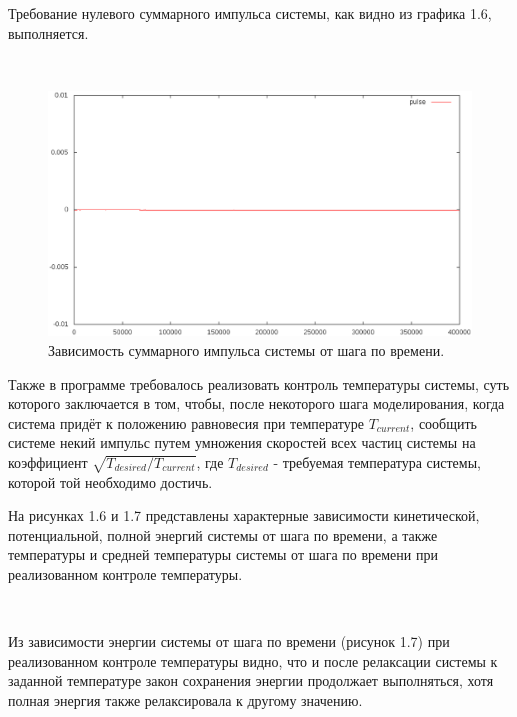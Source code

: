 \documentclass[14pt,a4paper,report]{ncc}
\begin{document}
Требование нулевого суммарного импульса системы, как видно из графика 1.6, выполняется.

 
\
\begin{figure}[h!]
\includegraphics[scale=0.6]{pulse400eps}
\caption{Зависимость суммарного импульса системы от шага по времени.}
\end{figure}
Также в программе требовалось реализовать контроль температуры системы, суть которого заключается в том, чтобы, после некоторого шага моделирования, когда система придёт к положению равновесия при температуре $T_{current}$, сообщить системе некий импульс путем умножения скоростей всех частиц системы на коэффициент $\sqrt{{T_{desired}}/{T_{current}}}$, где $T_{desired}$ - требуемая температура системы, которой той необходимо достичь.
\

На рисунках 1.6 и 1.7 представлены характерные зависимости кинетической, потенциальной, полной энергий системы от шага по времени, а также температуры и средней температуры системы от шага по времени при реализованном контроле температуры.

\

Из зависимости энергии системы от шага по времени (рисунок 1.7) при реализованном контроле температуры видно, что и после релаксации системы к заданной температуре закон сохранения энергии продолжает выполняться, хотя полная энергия также релаксировала к другому значению.
\end{document}
